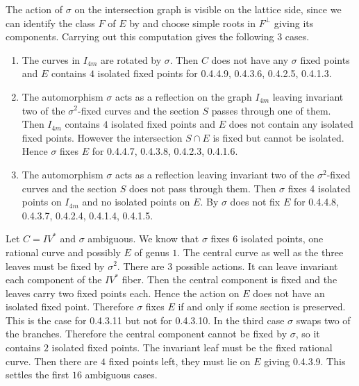\documentclass[a4paper]{amsart}
\theoremstyle{definition}
\theoremstyle{plain}
\begin{document}
The action of $\sigma$ on the intersection graph is visible on the lattice side, since we can identify the class $F$ of $E$ by  and choose simple roots in $F^\perp$ giving its components.
Carrying out this computation gives the following $3$ cases.
\begin{enumerate}
\item The curves in $I_{4m}$ are rotated by $\sigma$. Then $C$ does not have any $\sigma$ fixed points and $E$ contains $4$ isolated fixed points for 0.4.4.9, 0.4.3.6, 0.4.2.5, 0.4.1.3.

\item The automorphism $\sigma$ acts as a reflection on the graph $I_{4m}$ leaving invariant two of the $\sigma^2$-fixed curves and the section $S$ passes through one of them. Then $I_{4m}$ contains $4$ isolated fixed points and $E$ does not contain any isolated fixed points. However the intersection $S \cap E$ is fixed but cannot be isolated. Hence $\sigma$ fixes $E$ for 0.4.4.7, 0.4.3.8, 0.4.2.3, 0.4.1.6.

\item The automorphism $\sigma$ acts as a reflection leaving invariant two of the $\sigma^2$-fixed curves and the section $S$ does not pass through them. Then $\sigma$ fixes 4 isolated points on $I_{4m}$ and no isolated points on $E$. By  $\sigma$ does not fix $E$ for 0.4.4.8, 0.4.3.7, 0.4.2.4, 0.4.1.4, 0.4.1.5.
\end{enumerate}
%
%
%
%
%
%
%
%
%
%
%
%
%
%
%
%
%
%
%


Let $C = IV^*$ and $\sigma$ ambiguous. We know that $\sigma$ fixes $6$ isolated points, one rational curve and possibly $E$ of genus $1$.
The central curve as well as the three leaves must be fixed by $\sigma^2$. There are $3$ possible actions.
It can leave invariant each component of the $IV^*$ fiber. Then the central component is fixed and the leaves carry two fixed points each. Hence the action on $E$ does not have an isolated fixed point. Therefore $\sigma$ fixes $E$ if and only if some section is preserved. This is the case for 0.4.3.11 but not for 0.4.3.10.
In the third case $\sigma$ swaps two of the branches. Therefore the central component cannot be fixed by $\sigma$, so it contains $2$ isolated fixed points.
The invariant leaf must be the fixed rational curve. Then there are $4$ fixed points left, they must lie on $E$ giving 0.4.3.9.
This settles the first $16$ ambiguous cases.
\end{document}
